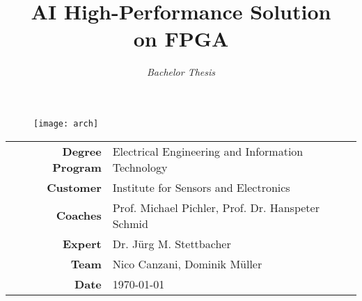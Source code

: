 \documentclass[final]{fhnwreport}
\title{\textbf{{\Huge AI High-Performance Solution \\[2mm] on FPGA}}}
\author{\textit{{\LARGE Bachelor Thesis}}}
\date{}
\begin{document}
\maketitle

\vfill
\begin{figure}[h]
  \centering
  \texttt{[image: arch]}
\end{figure}

\vfill
\begin{center}
  \begin{tabular}{>{\bfseries\large}rl}
    Degree Program & Electrical Engineering and Information Technology \\[2mm]
    Customer       & Institute for Sensors and Electronics \\[2mm]
    Coaches        & Prof. Michael Pichler, Prof. Dr. Hanspeter Schmid \\[2mm]
    Expert         & Dr. J\"urg M. Stettbacher \\[2mm]
    Team           & Nico Canzani, Dominik M\"uller \\[2mm]
    Date           & \today
  \end{tabular}
\end{center}
\clearpage


\clearpage


\clearpage

\tableofcontents
\clearpage










\printbibliography[heading=bibintoc]
\label{sec:literature}
\clearpage

\printglossary[type=\acronymtype]
\clearpage




\end{document}
